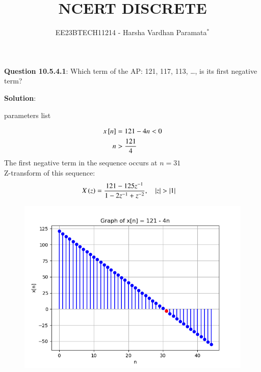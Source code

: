 \documentclass[journal,12pt,twocolumn]{IEEEtran}
\theoremstyle{remark}
\begin{document}

\vspace{3cm}

\title{NCERT DISCRETE}
\author{EE23BTECH11214 - Harsha Vardhan Paramata$^{*}$%
}
\maketitle
\newpage
\bigskip

\renewcommand{\thefigure}{\theenumi}
\renewcommand{\thetable}{\theenumi}

\textbf{Question 10.5.4.1}:
Which term of the AP: 121, 117, 113, \ldots, is its first negative term?

\textbf{Solution}:
\fi
\begin{table}[htbp]
\centering

\caption{parameters list}
\end{table}

\begin{align}
x{}\left[n\right] &= 121 - 4n < 0 \\
n &> \frac{121}{4} 
\end{align}
The first negative term in the sequence occurs at 
$n = 31$  \\
Z-transform of this sequence:
\begin{align}
    X\left(z\right) &= \frac{121 - 125z^{-1}}{1 - 2z^{-1} + z^{-2}}
 ,\quad \left\vert z\right\vert > \left\vert1\right\vert
\end{align}
\begin{figure}[!ht] 
\centering
\includegraphics[width=1\columnwidth]{ncert-maths/10/5/4/1/figs/graph.png}
\end{figure}
\end{document}
